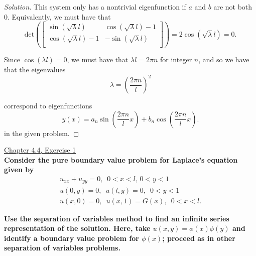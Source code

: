 \documentclass[11pt]{article}
\newenvironment{solution}
  {\renewcommand\qedsymbol{$\blacksquare$}\begin{proof}[Solution]}
  {\end{proof}}
\begin{document}
\begin{solution}
This system only has a nontrivial eigenfunction if $a$ and $b$ are not both $0$. Equivalently, we must have that
\[ \mathrm{det} \left( \begin{bmatrix}
    \sin(\sqrt{\lambda} l) & \cos(\sqrt{\lambda} l) - 1 \\
    \cos(\sqrt{\lambda} l) - 1 & -\sin(\sqrt{\lambda} l) \\
    \end{bmatrix} \right) = 2\cos(\sqrt{\lambda} l) = 0. \]

Since $\cos(\lambda l) = 0$, we must have that $\lambda l = 2\pi n$ for integer $n$, and so we have that the eigenvalues 
\[\boxed{\lambda = \left( \frac{2\pi n}{l}\right)^2}\] 

correspond to eigenfunctions \[ \boxed{y(x) = a_n \sin \left( \frac{2\pi n}{l} x\right) + b_n \cos \left( \frac{2\pi n}{l} x\right)}.\]
in the given problem. \end{solution}

\newpage

\underline{Chapter 4.4, Exercise 1} \\

\textbf{Consider the pure boundary value problem for Laplace's equation given by}
\[
\begin{array}{c}
    u_{xx} + u_{yy} = 0, \, \, \, 0 < x< l, \, 0 < y < 1 \\
    u(0, y) =0, \, \, \, u(l, y) = 0, \, \, \, 0 < y < 1 \\
    u(x, 0) = 0, \, \, \, u(x, 1) = G(x), \, \, \, 0 < x < l.
\end{array}
\]

\textbf{Use the separation of variables method to find an infinite series representation of the solution. Here, take $u(x, y) = \phi(x)\phi(y)$ and identify a boundary value problem for $\phi(x)$; proceed as in other separation of variables problems.}
\end{document}
